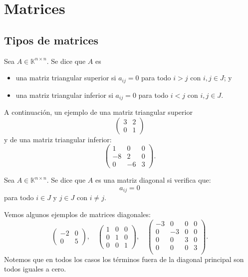 \documentclass[compacto,10pt]{pubciencias-notas}
\begin{document}
\encabezado

\vspace{-8mm}

\section{Matrices}
\setcounter{subsection}{2}
\subsection{Tipos de matrices}

\begin{defi}
    Sea $A\in \mathbb{K}^{n \times n}$. Se dice que $A$ es
    \begin{itemize}
    \item 
        una matriz triangular superior si $a_{ij} = 0 $ para todo $i>j$ con $i,j \in J$; y
    \item 
        una matriz triangular inferior si $a_{ij} = 0 $ para todo $i<j$ con $i,j \in J$.
    \end{itemize}
\end{defi}

\begin{ejem}
A continuación, un ejemplo de una matriz triangular superior
\[
	\begin{pmatrix}3&2\\0&1\end{pmatrix}
\]
y de una matriz triangular inferior:
\[
	\begin{pmatrix}1&0&0\\-8&2&0\\0&-6&3\end{pmatrix}.
\]
\end{ejem}

\begin{defi}
    Sea $A\in \mathbb{K}^{n \times n}$. Se dice que $A$ es una matriz diagonal si verifica que:
    \[ 
        a_{ij} = 0
    \]
    para todo $i\in J$ y $j\in J$ con $i\neq j$.
\end{defi}

\begin{ejem}
Vemos algunos ejemplos de matrices diagonales:
\[
	\begin{pmatrix}
	-2&0\\
	0&5
	\end{pmatrix},
	\quad
 	\begin{pmatrix}
	1&0&0\\
	0&1&0\\
	0&0&1
	\end{pmatrix},
	\quad
	\begin{pmatrix}
	-3&0&0&0\\
	0&-3&0&0\\
	0&0&3&0\\
	0&0&0&3\\
	\end{pmatrix}.
\]
Notemos que en todos los casos los términos fuera de la diagonal principal son todos iguales a cero. 
\end{ejem}
\end{document}
